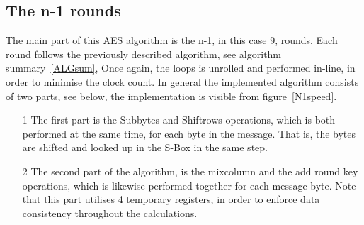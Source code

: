 \documentclass[Report.tex]{subfiles}
\begin{document}
\subsection{The n-1 rounds}
The main part of this AES algorithm is the n-1, in this case 9, rounds.
Each round follows the previously described algorithm, see algorithm summary~\ref{ALGsum},
Once again, the loops is unrolled and performed in-line, in order to minimise the clock count.
In general the implemented algorithm consists of two parts, see below, the implementation is visible from figure~\ref{N1speed}.
\begin{itemize}
\item[1] The first part is the Subbytes and Shiftrows operations, which is both performed at the same time,
for each byte in the message. That is, the bytes are shifted and looked up in the S-Box in the same step. 
\item[2] The second part of the algorithm, is the mixcolumn and the add round key operations,
which is likewise performed together for each message byte. Note that this part utilises 4 temporary registers,
in order to enforce data consistency throughout the calculations.
\end{itemize}
\end{document}
